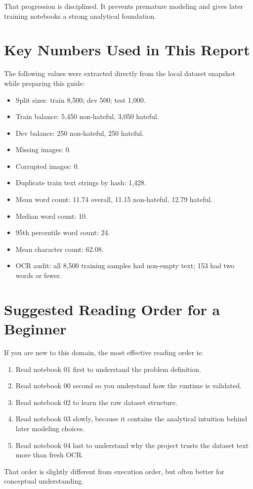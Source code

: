 \documentclass[11pt,a4paper]{report}
\begin{document}
That progression is disciplined. It prevents premature modeling and gives later training notebooks a strong analytical foundation.

\appendix

\chapter{Key Numbers Used in This Report}

The following values were extracted directly from the local dataset snapshot while preparing this guide:

\begin{itemize}
\item Split sizes: train 8,500; dev 500; test 1,000.
\item Train balance: 5,450 non-hateful, 3,050 hateful.
\item Dev balance: 250 non-hateful, 250 hateful.
\item Missing images: 0.
\item Corrupted images: 0.
\item Duplicate train text strings by hash: 1,428.
\item Mean word count: 11.74 overall, 11.15 non-hateful, 12.79 hateful.
\item Median word count: 10.
\item 95th percentile word count: 24.
\item Mean character count: 62.08.
\item OCR audit: all 8,500 training samples had non-empty text; 153 had two words or fewer.
\end{itemize}

\chapter{Suggested Reading Order for a Beginner}

If you are new to this domain, the most effective reading order is:

\begin{enumerate}[label=\arabic*.]
\item Read notebook 01 first to understand the problem definition.
\item Read notebook 00 second so you understand how the runtime is validated.
\item Read notebook 02 to learn the raw dataset structure.
\item Read notebook 03 slowly, because it contains the analytical intuition behind later modeling choices.
\item Read notebook 04 last to understand why the project trusts the dataset text more than fresh OCR.
\end{enumerate}

That order is slightly different from execution order, but often better for conceptual understanding.
\end{document}
